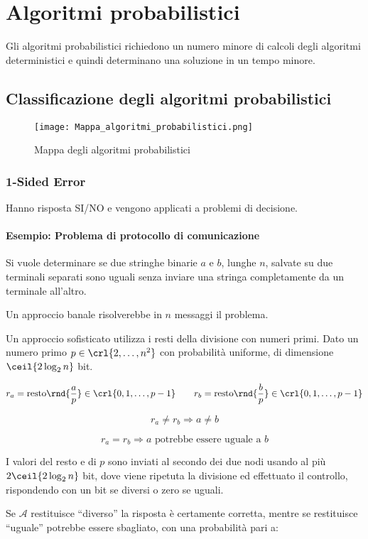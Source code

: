 \documentclass[\main/main.tex]{subfiles}
\begin{document}
\chapter{Algoritmi probabilistici}
Gli algoritmi probabilistici richiedono un numero minore di calcoli degli algoritmi deterministici e quindi determinano una soluzione in un tempo minore.

\section{Classificazione degli algoritmi probabilistici}
\begin{figure}
	\texttt{[image: Mappa\_algoritmi\_probabilistici.png]}
	\caption{Mappa degli algoritmi probabilistici}
\end{figure}

\subsection{1-Sided Error}
Hanno risposta SI/NO e vengono applicati a problemi di decisione.

\subsubsection{Esempio: Problema di protocollo di comunicazione}
Si vuole determinare se due stringhe binarie \(a\) e \(b\), lunghe \(n\), salvate su due terminali separati sono uguali senza inviare una stringa completamente da un terminale all'altro.

Un approccio banale risolverebbe in \(n\) messaggi il problema.

Un approccio sofisticato utilizza i resti della divisione con numeri primi. Dato un numero primo \(p \in \crl{2, \ldots, n^2}\) con probabilità uniforme, di dimensione \(\ceil{2\log_2{n}}\) bit.

\[
	r_a = \text{resto}\rnd{\frac{a}{p}} \in \crl{0,1, \ldots, p-1} \qquad r_b = \text{resto}\rnd{\frac{b}{p}} \in \crl{0,1, \ldots, p-1}
\]

\[
	r_a \neq r_b \Rightarrow a \neq b
\]

\[
	r_a = r_b \Rightarrow a \text{ potrebbe essere uguale a } b
\]

I valori del resto e di \(p\) sono inviati al secondo dei due nodi usando al più \(2\ceil{2\log_2{n}}\) bit, dove viene ripetuta la divisione ed effettuato il controllo, rispondendo con un bit se diversi o zero se uguali.

Se \(\mathcal{A}\) restituisce ``diverso'' la risposta è certamente corretta, mentre se restituisce ``uguale'' potrebbe essere sbagliato, con una probabilità pari a:
\end{document}
